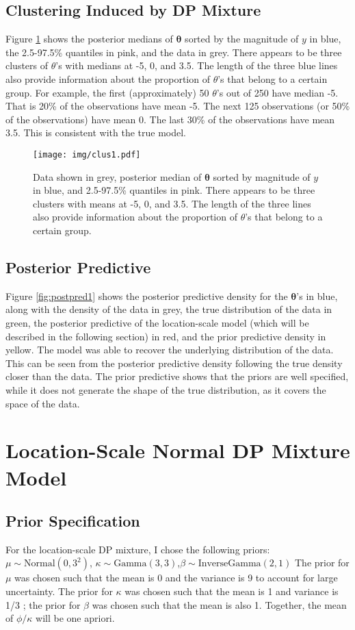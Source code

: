 \documentclass{article}
\def\beginmyfig{\begin{figure}[h]\center}
\def\endmyfig{\end{figure}}
\newcommand{\m}[1]{\mathbf{\bm{#1}}} %
\begin{document}
\subsection{Clustering Induced by DP Mixture}
Figure \ref{fig:clus1} shows the posterior medians of $\m\theta$ sorted by the
magnitude of $y$ in blue, the 2.5-97.5\% quantiles in pink, and the data in
grey.  There appears to be three clusters of $\theta$'s with medians at -5, 0,
and 3.5. The length of the three blue lines also provide information about the
proportion of $\theta$'s that belong to a certain group. For example, the first
(approximately) 50 $\theta$'s out of 250 have median -5. That is 20\% of the
observations have mean -5. The next 125 observations (or 50\% of the
observations) have mean 0. The last 30\% of the observations have mean 3.5.
This is consistent with the true model.  \\
\beginmyfig
  \texttt{[image: img/clus1.pdf]}
  \caption{Data shown in grey, posterior median of $\m\theta$ sorted
  by magnitude of $y$ in blue, and 2.5-97.5\% quantiles in pink.
  There appears to be three clusters with means at -5, 0, and 3.5.
  The length of the three lines also provide information about 
  the proportion of $\theta$'s that belong to a certain group.}
  \label{fig:clus1}
\endmyfig


\subsection{Posterior Predictive}
Figure \ref{fig:postpred1} shows the posterior predictive density for the
$\m\theta$'s in blue, along with the density of the data in grey, the true
distribution of the data in green, the posterior predictive of the
location-scale model (which will be described in the following section) in red,
and the prior predictive density in yellow.  The model was able to recover the
underlying distribution of the data. This can be seen from the posterior
predictive density following the true density closer than the data. The prior
predictive shows that the priors are well specified, while it does not generate
the shape of the true distribution, as it covers the space of the data.

\section{Location-Scale Normal DP Mixture Model}
\subsection{Prior Specification}
For the location-scale DP mixture, I chose the following priors:
$\mu\sim\text{Normal}(0,3^2) $, $\kappa\sim\text{Gamma}(3,3)$,$\beta\sim\text{InverseGamma}(2,1)$
The prior for $\mu$ was chosen such that the mean is 0 and the variance is 9 to
account for large uncertainty. The prior for $\kappa$ was chosen such that the
mean is 1 and variance is 1/3 ; the prior for $\beta$ was chosen such that the
mean is also 1. Together, the mean of $\phi/\kappa$ will be one apriori.
\end{document}
